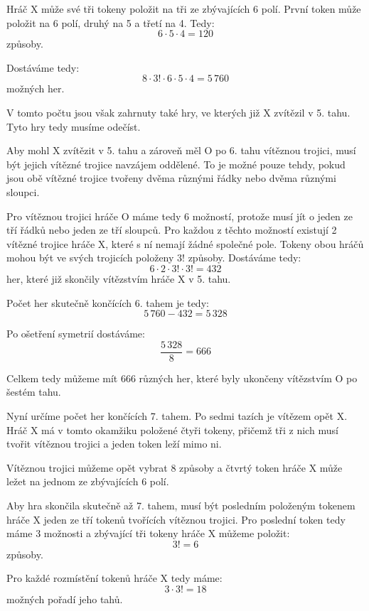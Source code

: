 \documentclass[12pt,a4paper]{article}
\begin{document}
Hráč $\mathrm{X}$ může své tři tokeny položit na tři ze zbývajících 6 polí. 
První token může položit na 6 polí, druhý na 5 a třetí na 4. Tedy:
\[
    6\cdot5\cdot4 = 120
\]
způsoby.

Dostáváme tedy:
\[
    8\cdot3!\cdot6\cdot5\cdot4 = 5\,760
\]
možných her.

V tomto počtu jsou však zahrnuty také hry, ve kterých již $\mathrm{X}$ zvítězil v 5. tahu. 
Tyto hry tedy musíme odečíst.

Aby mohl $\mathrm{X}$ zvítězit v 5. tahu a zároveň měl $\mathrm{O}$ po 6. tahu vítěznou trojici,
musí být jejich vítězné trojice navzájem oddělené. 
To je možné pouze tehdy, pokud jsou obě vítězné trojice tvořeny dvěma různými řádky nebo dvěma různými sloupci.

Pro vítěznou trojici hráče $\mathrm{O}$ máme tedy 6 možností, 
protože musí jít o jeden ze tří řádků nebo jeden ze tří sloupců. 
Pro každou z těchto možností existují 2 vítězné trojice hráče $\mathrm{X}$, 
které s ní nemají žádné společné pole. 
Tokeny obou hráčů mohou být ve svých trojicích položeny $3!$ způsoby. 
Dostáváme tedy:
\[
    6\cdot2\cdot3!\cdot3! = 432
\]
her, které již skončily vítězstvím hráče $\mathrm{X}$ v 5. tahu.

Počet her skutečně končících 6. tahem je tedy:
\[
    5\,760-432 = 5\,328
\]

Po ošetření symetrií dostáváme:
\begin{equation}
    \frac{5\,328}{8} = 666
\end{equation}

Celkem tedy můžeme mít $666$ různých her, 
které byly ukončeny vítězstvím $\mathrm{O}$ po šestém tahu.

Nyní určíme počet her končících 7. tahem.
Po sedmi tazích je vítězem opět $\mathrm{X}$. 
Hráč $\mathrm{X}$ má v tomto okamžiku položené čtyři tokeny, 
přičemž tři z nich musí tvořit vítěznou trojici a jeden token leží mimo ni.

Vítěznou trojici můžeme opět vybrat 8 způsoby a 
čtvrtý token hráče $\mathrm{X}$ může ležet na jednom ze zbývajících 6 polí.

Aby hra skončila skutečně až 7. tahem, musí být posledním položeným tokenem hráče 
$\mathrm{X}$ jeden ze tří tokenů tvořících vítěznou trojici. 
Pro poslední token tedy máme 3 možnosti 
a zbývající tři tokeny hráče $\mathrm{X}$ můžeme položit:
\[
    3! = 6
\]
způsoby.

Pro každé rozmístění tokenů hráče $\mathrm{X}$ tedy máme:
\[
    3\cdot3! = 18
\]
možných pořadí jeho tahů.
\end{document}
